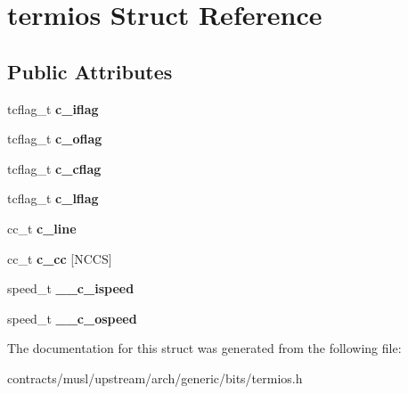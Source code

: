 \hypertarget{structtermios}{}\section{termios Struct Reference}
\label{structtermios}
\subsection*{Public Attributes}
\begin{DoxyCompactItemize}
\item 
\mbox{\label{structtermios_a85b6c86d2a3db45a3829488190e357e4}} 
tcflag\+\_\+t {\bfseries c\+\_\+iflag}
\item 
\mbox{\label{structtermios_ad6e2cfedb81530e5a6a3a0e30b8c6362}} 
tcflag\+\_\+t {\bfseries c\+\_\+oflag}
\item 
\mbox{\label{structtermios_a5d42b95faa4745c3bea53652d2812162}} 
tcflag\+\_\+t {\bfseries c\+\_\+cflag}
\item 
\mbox{\label{structtermios_a91bdd7691180800fccc4b791466ee9c3}} 
tcflag\+\_\+t {\bfseries c\+\_\+lflag}
\item 
\mbox{\label{structtermios_aeeafa1ceb36342fd91b67027dbdaaf8a}} 
cc\+\_\+t {\bfseries c\+\_\+line}
\item 
\mbox{\label{structtermios_a5fbe3e4316082afab45fc424938ef13a}} 
cc\+\_\+t {\bfseries c\+\_\+cc} \mbox{[}N\+C\+CS\mbox{]}
\item 
\mbox{\label{structtermios_af08d68624211a3e269c7fa33b39c6989}} 
speed\+\_\+t {\bfseries \+\_\+\+\_\+c\+\_\+ispeed}
\item 
\mbox{\label{structtermios_a9516e449335ca92b2291a760dc58686b}} 
speed\+\_\+t {\bfseries \+\_\+\+\_\+c\+\_\+ospeed}
\end{DoxyCompactItemize}


The documentation for this struct was generated from the following file\+:\begin{DoxyCompactItemize}
\item 
contracts/musl/upstream/arch/generic/bits/termios.\+h\end{DoxyCompactItemize}
